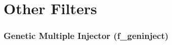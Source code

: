 \documentclass{article}
\begin{document}
%

\part*{Other Filters}

%

\section*{Genetic Multiple Injector (f\_geninject)}
\end{document}
